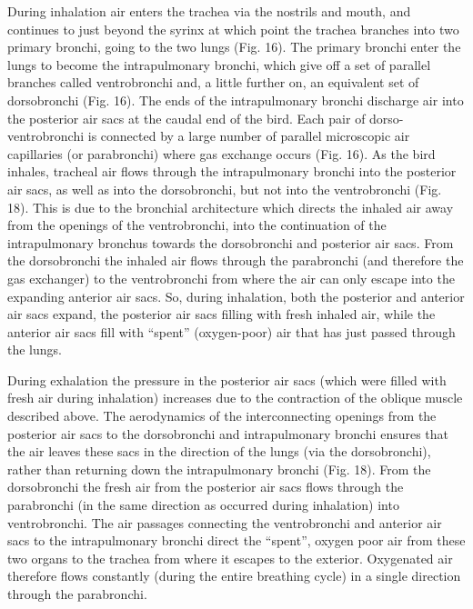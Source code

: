 During inhalation air enters the trachea via the nostrils and mouth, and continues to just beyond the syrinx at which point the trachea branches into two primary bronchi, going to the two lungs (Fig. 16). The primary bronchi enter the lungs to become the intrapulmonary bronchi, which give off a set of parallel branches called ventrobronchi and, a little further on, an equivalent set of dorsobronchi (Fig. 16). The ends of the intrapulmonary bronchi discharge air into the posterior air sacs at the caudal end of the bird. Each pair of dorso-ventrobronchi is connected by a large number of parallel microscopic air capillaries (or parabronchi) where gas exchange occurs (Fig. 16). As the bird inhales, tracheal air flows through the intrapulmonary bronchi into the posterior air sacs, as well as into the dorsobronchi, but not into the ventrobronchi (Fig. 18). This is due to the bronchial architecture which directs the inhaled air away from the openings of the ventrobronchi, into the continuation of the intrapulmonary bronchus towards the dorsobronchi and posterior air sacs. From the dorsobronchi the inhaled air flows through the parabronchi (and therefore the gas exchanger) to the ventrobronchi from where the air can only escape into the expanding anterior air sacs. So, during inhalation, both the posterior and anterior air sacs expand, the posterior air sacs filling with fresh inhaled air, while the anterior air sacs fill with ``spent'' (oxygen-poor) air that has just passed through the lungs.

During exhalation the pressure in the posterior air sacs (which were filled with fresh air during inhalation) increases due to the contraction of the oblique muscle described above. The aerodynamics of the interconnecting openings from the posterior air sacs to the dorsobronchi and intrapulmonary bronchi ensures that the air leaves these sacs in the direction of the lungs (via the dorsobronchi), rather than returning down the intrapulmonary bronchi (Fig. 18). From the dorsobronchi the fresh air from the posterior air sacs flows through the parabronchi (in the same direction as occurred during inhalation) into ventrobronchi. The air passages connecting the ventrobronchi and anterior air sacs to the intrapulmonary bronchi direct the ``spent'', oxygen poor air from these two organs to the trachea from where it escapes to the exterior. Oxygenated air therefore flows constantly (during the entire breathing cycle) in a single direction through the parabronchi.

